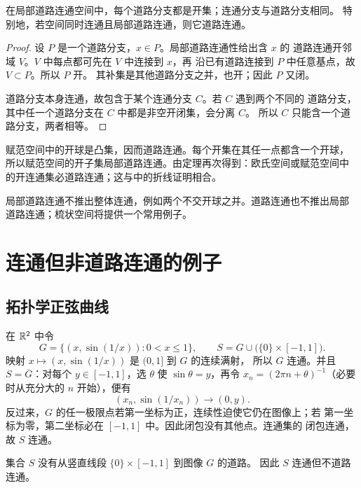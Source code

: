 \begin{theorem}[局部道路连通空间的分支]
\label{thm:metric-locally-path-connected-components}
在局部道路连通空间中，每个道路分支都是开集；连通分支与道路分支相同。
特别地，若空间同时连通且局部道路连通，则它道路连通。
\end{theorem}

\begin{proof}
设 \(P\) 是一个道路分支，\(x\in P\)。局部道路连通性给出含 \(x\) 的
道路连通开邻域 \(V\)。\(V\) 中每点都可先在 \(V\) 中连接到 \(x\)，再
沿已有道路连接到 \(P\) 中任意基点，故 \(V\subset P\)。所以 \(P\) 开。
其补集是其他道路分支之并，也开；因此 \(P\) 又闭。

道路分支本身连通，故包含于某个连通分支 \(C\)。若 \(C\) 遇到两个不同的
道路分支，其中任一个道路分支在 \(C\) 中都是非空开闭集，会分离 \(C\)。
所以 \(C\) 只能含一个道路分支，两者相等。
\end{proof}

赋范空间中的开球是凸集，因而道路连通。每个开集在其任一点都含一个开球，
所以赋范空间的开子集局部道路连通。由定理再次得到：欧氏空间或赋范空间中
的开连通集必道路连通；这与中的折线证明相合。

局部道路连通不推出整体连通，例如两个不交开球之并。道路连通也不推出局部
道路连通；梳状空间将提供一个常用例子。

\section{连通但非道路连通的例子}

\subsection{拓扑学正弦曲线}

在 \(\mathbb{R}^2\) 中令
\[
 G=\{(x,\sin(1/x)):0<x\le1\},
\qquad
 S=G\cup\bigl(\{0\}\times[-1,1]\bigr).
\]
映射 \(x\mapsto(x,\sin(1/x))\) 是 \((0,1]\) 到 \(G\) 的连续满射，
所以 \(G\) 连通。并且 \(S=\overline G\)：对每个 \(y\in[-1,1]\)，选
\(\theta\) 使 \(\sin\theta=y\)，再令
\(x_n=(2\pi n+\theta)^{-1}\)（必要时从充分大的 \(n\) 开始），便有
\[
 (x_n,\sin(1/x_n))\longrightarrow(0,y).
\]
反过来，\(G\) 的任一极限点若第一坐标为正，连续性迫使它仍在图像上；若
第一坐标为零，第二坐标必在 \([-1,1]\) 中。因此闭包没有其他点。连通集的
闭包连通，故 \(S\) 连通。

\begin{theorem}[拓扑学正弦曲线不是道路连通的]
\label{thm:topologists-sine-curve-not-path-connected}
集合 \(S\) 没有从竖直线段 \(\{0\}\times[-1,1]\) 到图像 \(G\) 的道路。
因此 \(S\) 连通但不道路连通。
\end{theorem}

